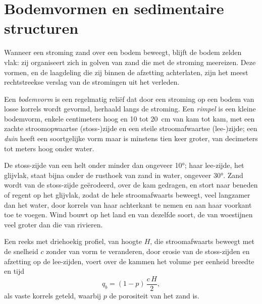 \section{Bodemvormen en sedimentaire structuren}\label{sec:b1:clastic-sediments:bedforms}

Wanneer een stroming zand over een bodem beweegt, blijft de bodem zelden vlak: zij organiseert zich in golven van zand die met de stroming meereizen. Deze vormen, en de laagdeling die zij binnen de afzetting achterlaten, zijn het meest rechtstreekse verslag van de stromingen uit het verleden.

\begin{definition}\label{def:b1:clastic-sediments:bedform}
Een \emph{bodemvorm} is een regelmatig reliëf dat door een stroming op een bodem van losse korrels wordt gevormd, herhaald langs de stroming. Een \emph{rimpel} is een kleine bodemvorm, enkele centimeters hoog en 10 tot \qty{20}{cm} van kam tot kam, met een zachte stroomopwaartse (stoss-)zijde en een steile stroomafwaartse (lee-)zijde; een \emph{duin} heeft een soortgelijke vorm maar is minstens tien keer groter, van decimeters tot meters hoog onder water.
\end{definition}

De stoss-zijde van een  helt onder minder dan ongeveer \ang{10}; haar lee-zijde, het glijvlak, staat bijna onder de rusthoek van zand in water, ongeveer \ang{30}. Zand wordt van de stoss-zijde geërodeerd, over de kam gedragen, en
stort naar beneden of regent op het glijvlak, zodat de hele  stroomafwaarts beweegt, veel langzamer dan het water, door korrels van haar achterkant te nemen en aan haar voorkant toe te voegen. Wind bouwt op het land  en  van dezelfde soort, de  van woestijnen veel groter dan die van rivieren.

\begin{proposition}\label{prop:b1:clastic-sediments:migration}
Een reeks  met driehoekig profiel, van hoogte $H$, die stroomafwaarts beweegt met de snelheid $c$ zonder van vorm te veranderen, door erosie van de stoss-zijden en afzetting op de lee-zijden, voert over de kammen het volume  per eenheid breedte en tijd
\[
  q_b = (1 - p)\,\frac{c\,H}{2},
\]
als vaste korrels geteld, waarbij $p$ de porositeit van het zand is.
\end{proposition}

